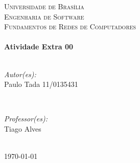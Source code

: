 \begin{titlepage}

\center %
 

\textsc{\LARGE Universidade de Brasília}\\[1.5cm]	%
\textsc{\Large Engenharia de Software}\\[0.5cm]		%
\textsc{\large Fundamentos de Redes de Computadores}\\[0.5cm]		%


\HRule \\[0.4cm]
{ \huge \bfseries Atividade Extra 00}\\[0.4cm] %
\HRule \\[1.5cm]
 

\begin{minipage}{0.4\textwidth}
\begin{flushleft} \large
\emph{Autor(es):}\\
Paulo Tada 11/0135431%
\end{flushleft}
\end{minipage}
~
\begin{minipage}{0.4\textwidth}
\begin{flushright} \large
\emph{Professor(es):} \\
Tiago Alves %
\end{flushright}
\end{minipage}\\[4cm]


{\large \today}\\[3cm] %



\vfill %

\end{titlepage}
